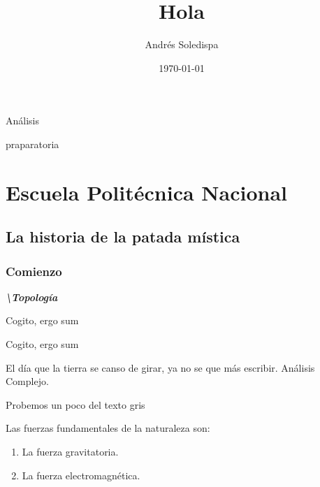 \documentclass[a4paper,12pt]{article}
\author{Andrés Soledispa}
\title{Hola}
\date{\today}
\begin{document}
\maketitle

Análisis

praparatoria
\section[EPN]{Escuela Politécnica Nacional}
\subsection{La historia de la patada mística}
\subsubsection{Comienzo}
\emph{\textbf{\textbackslash{\LARGE Topología}}}

\Large 
\color{red}
Cogito, ergo sum

\color{blue}
\LARGE
\centerline{Cogito, ergo sum}
\begin{center}

El día que la tierra se canso de girar,\hspace{10cm} ya no se que más escribir.
\vspace{10cm}Análisis Complejo. 

Probemos un poco del texto gris


\noindent Las fuerzas fundamentales de la naturaleza son:
\begin{enumerate}
\item {La fuerza gravitatoria.}
\item {La fuerza electromagnética.} 
\end{enumerate}

\end{center}
\end{document}
